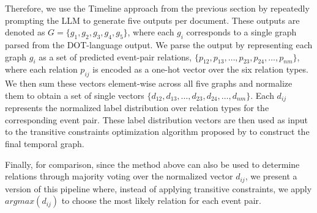 Therefore, we use the Timeline approach from the previous section by repeatedly prompting the LLM to generate five outputs per document. These outputs are denoted as \( G = \{g_1, g_2, g_3, g_4, g_5\} \), where each \( g_i \) corresponds to a single graph parsed from the DOT-language output. We parse the output by representing each graph \( g_i \) as a set of predicted event-pair relations, \( \{p_{12}, p_{13}, \dots, p_{23}, p_{24}, \dots, p_{nm}\} \), where each relation \( p_{ij} \) is encoded as a one-hot vector over the six relation types. We then sum these vectors element-wise across all five graphs and normalize them to obtain a set of single vectors \( \{d_{12}, d_{13}, \dots, d_{23}, d_{24}, \dots, d_{nm}\} \). Each \( d_{ij} \) represents the normalized label distribution over relation types for the corresponding event pair. These label distribution vectors are then used as input to the transitive constraints optimization algorithm proposed by \citet{ning-etal-2018-joint} to construct the final temporal graph.


Finally, for comparison, since the method above can also be used to determine relations through majority voting over the normalized vector $d_{ij}$, we present a version of this pipeline where, instead of applying transitive constraints, we apply $argmax(d_{ij})$ to choose the most likely relation for each event pair.

% 

% 

